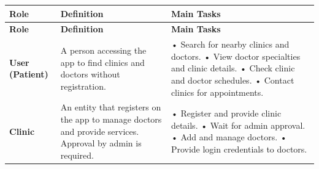 \documentclass[12pt]{report}
\begin{document}
\renewcommand{\arraystretch}{1.3} %

\begin{longtable}{|p{3cm}|p{6cm}|p{6cm}|}
	
	\hline
	\rowcolor[HTML]{C0C0C0}
	\hspace*{1cm}\textbf{Role}                                                                               & \hspace*{1.9cm} \textbf{Definition}                                                                 & \hspace*{1.9cm}\textbf{Main Tasks} \\
	\hline
	\endfirsthead

	\hline
	\rowcolor[HTML]{C0C0C0}
	\hspace*{1cm}\textbf{Role}                                                                                              & \hspace*{1.9cm} \textbf{Definition}                                                                 & \hspace*{1.9cm}\textbf{Main Tasks} \\
	\hline
	\endhead

	\hspace*{0.1cm}\textbf{User (Patient)}                                                                                    & A person accessing the app to find clinics and doctors without registration.        &
	• Search for nearby clinics and doctors.\newline
	• View doctor specialties and clinic details.\newline
	• Check clinic and doctor schedules.\newline
	• Contact clinics for appointments.                                                                                                                                                                                    \\
	\hline

	\hspace*{0.9cm}\textbf{Clinic}                                                                                            &
	An entity that registers on the app to manage doctors and provide services. Approval by admin is required. &
	• Register and provide clinic details.\newline
	• Wait for admin approval.\newline
	• Add and manage doctors.\newline
	• Provide login credentials to doctors.                                                                                                                                                                                \\
	\hline



\end{longtable}
\end{document}
